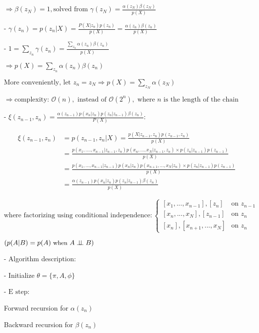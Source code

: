        $\Rightarrow \beta(z_N) = 1, \text{solved from } \gamma(z_N) =  \frac{\alpha(z_N)\beta(z_N)}{p(X)}$ 

     - $\displaystyle \gamma(z_n) = p(z_n|X) = \frac{P(X|z_n)p(z_n)} {p(X)} = \frac{\alpha(z_n) \beta(z_n)}{p(X)}$ 

     - $\displaystyle 1 = \sum_{z_n}\gamma(z_n) = \frac{\sum_{z_n} \alpha(z_n)\beta(z_n)}{p(X)}$ 

       $\displaystyle \Rightarrow p(X) = \sum_{z_n} \alpha(z_n)\beta(z_n)$ 

       $\text{More conveniently, let } \displaystyle z_n=z_N \Rightarrow p(X)=\sum_{z_N}\alpha(z_N)$

       $\Rightarrow \text{complexity: } \mathcal O(n), \text{ instead of } \mathcal O(2^n), \text{ where } n \text{ is the length of the chain}$ 

     - $\displaystyle \xi(z_{n-1}, z_n) = \frac {\alpha(z_{n-1})p(x_n|z_n)p(z_n|z_{n-1})\beta(z_n)} {P(X)}:$ 

       \begin{align} \displaystyle \xi(z_{n-1}, z_n) &= p(z_{n-1},z_n|X) = \frac{p(X|z_{n-1},z_n)p(z_{n-1},z_n)}{p(X)} \\ &= \frac{p(x_1,....,x_{n-1}| z_{n-1},z_n) p(x_n,...,x_N|z_{n-1} ,z_n) \times p(z_n|z_{n-1})p(z_{n-1})} {p(X)} \\ &= \frac{p(x_1,...,x_{n-1}|z_{n-1}) p(x_n|z_n)p(x_{n+1},...,x_N|z_n) \times p(z_n|z_{n-1})p(z_{n-1})} {p(X)} \\ &= \frac {\alpha(z_{n-1})p(x_n|z_n)p(z_n|z_{n-1})\beta(z_n)} {p(X)} \end{align}

       $\text{where factorizing using conditional independence}: \begin{cases} [x_1,...,x_{n-1}],[z_n] &\text{on } z_{n-1} \\ [x_n,...,x_N],[z_{n-1}] &\text{on } z_n  \\ [x_n],[x_{n+1},...,x_N] &\text{on } z_n \end{cases}$ 

       $\small (p(A|B)=p(A) \text{ when } A\perp\!\!\!\perp B) $ 

   - Algorithm description:

     - Initialize $\theta = \{ \pi,A,\phi \}$ 

     - $\text{E step:}$ 

       Forward recursion for $\alpha(z_n)$ 

       Backward recursion for $\beta(z_n)$ 

